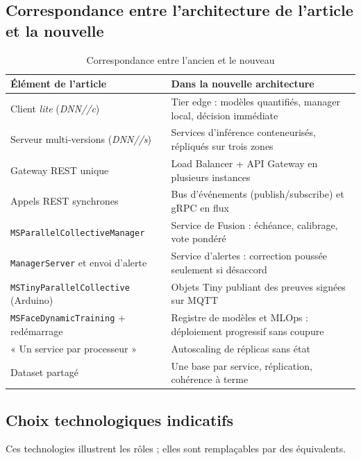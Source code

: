 \documentclass[11pt,a4paper]{article}
\begin{document}
\subsection{Correspondance entre l'architecture de l'article et la nouvelle}

\begin{table}[h]
\centering
\begin{tabular}{|p{5.6cm}|p{9.0cm}|}
\hline
\textbf{Élément de l'article} & \textbf{Dans la nouvelle architecture} \\
\hline
Client \textit{lite} (\textit{DNN//c}) & Tier edge : modèles quantifiés, manager local, décision immédiate \\
\hline
Serveur multi-versions (\textit{DNN//s}) & Services d'inférence conteneurisés, répliqués sur trois zones \\
\hline
Gateway REST unique & Load Balancer + API Gateway en plusieurs instances \\
\hline
Appels REST synchrones & Bus d'événements (publish/subscribe) et gRPC en flux \\
\hline
\texttt{MSParallelCollectiveManager} & Service de Fusion : échéance, calibrage, vote pondéré \\
\hline
\texttt{ManagerServer} et envoi d'alerte & Service d'alertes : correction poussée seulement si désaccord \\
\hline
\texttt{MSTinyParallelCollective} (Arduino) & Objets Tiny publiant des preuves signées sur MQTT \\
\hline
\texttt{MSFaceDynamicTraining} + redémarrage & Registre de modèles et MLOps : déploiement progressif sans coupure \\
\hline
« Un service par processeur » & Autoscaling de réplicas sans état \\
\hline
Dataset partagé & Une base par service, réplication, cohérence à terme \\
\hline
\end{tabular}
\caption{Correspondance entre l'ancien et le nouveau}
\end{table}

\subsection{Choix technologiques indicatifs}

Ces technologies illustrent les rôles ; elles sont remplaçables par des équivalents.
\end{document}

